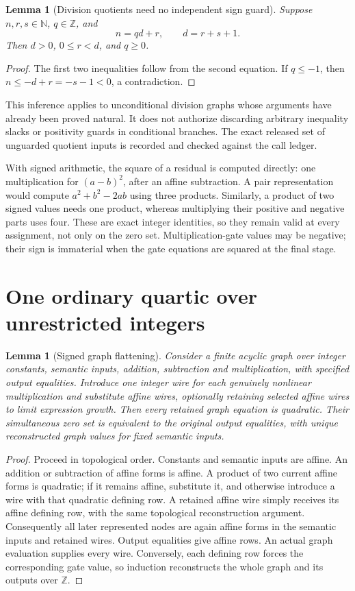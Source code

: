 \documentclass[11pt,a4paper]{article}
\newtheorem{lemma}[theorem]{Lemma}
\theoremstyle{definition}\newtheorem{definition}[theorem]{Definition}
\theoremstyle{remark}\newtheorem{remark}[theorem]{Remark}
\newcommand{\N}{\mathbb N}\newcommand{\Z}{\mathbb Z}\newcommand{\Q}{\mathbb Q}
\numberwithin{equation}{section}
\begin{document}
\begin{lemma}[Division quotients need no independent sign guard]
Suppose \(n,r,s\in\N\), \(q\in\Z\), and
\[
 n=qd+r,\qquad d=r+s+1.
\]
Then \(d>0\), \(0\le r<d\), and \(q\ge0\).
\end{lemma}
\begin{proof}
The first two inequalities follow from the second equation. If
\(q\le-1\), then \(n\le-d+r=-s-1<0\), a contradiction.
\end{proof}

This inference applies to unconditional division graphs whose arguments
have already been proved natural. It does not authorize discarding
arbitrary inequality slacks or positivity guards in conditional
branches. The exact released set of unguarded quotient inputs is recorded
and checked against the call ledger.

With signed arithmetic, the square of a residual is computed directly:
one multiplication for \((a-b)^2\), after an affine subtraction. A pair
representation would compute \(a^2+b^2-2ab\) using three products.
Similarly, a product of two signed values needs one product, whereas
multiplying their positive and negative parts uses four. These are exact
integer identities, so they remain valid at every assignment, not only
on the zero set. Multiplication-gate values may be negative; their sign
is immaterial when the gate equations are squared at the final stage.

\section{One ordinary quartic over unrestricted integers}
\label{sec:quartic}

\begin{lemma}[Signed graph flattening]\label{lem:flatten}
Consider a finite acyclic graph over integer constants, semantic inputs,
addition, subtraction and multiplication, with specified output
equalities. Introduce one integer wire for each genuinely nonlinear
multiplication and substitute affine wires, optionally retaining selected
affine wires to limit expression growth. Then every
retained graph equation is quadratic. Their simultaneous zero set is
equivalent to the original output equalities, with unique reconstructed
graph values for fixed semantic inputs.
\end{lemma}
\begin{proof}
Proceed in topological order. Constants and semantic inputs are affine.
An addition or subtraction of affine forms is affine. A product of two
current affine forms is quadratic; if it remains affine, substitute it,
and otherwise introduce a wire with that quadratic defining row. A retained affine wire simply receives its affine defining
row, with the same topological reconstruction argument.
Consequently all later represented nodes are again affine forms in the
semantic inputs and retained wires. Output equalities give affine rows.
An actual graph evaluation supplies every wire. Conversely, each
defining row forces the corresponding gate value, so induction
reconstructs the whole graph and its outputs over \(\Z\).
\end{proof}
\end{document}
